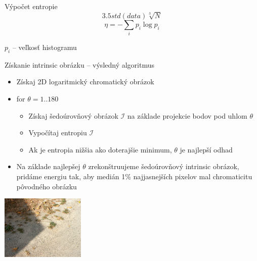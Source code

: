 \documentclass[red]{beamer}
\begin{document}
\begin{frame}{Výpočet entropie}
\pause
{}
\pause
{}
$$ 3.5 std(data)\sqrt[3]{N} $$
\pause
{}
$$ \eta = - \sum_i p_i \log p_i $$
\vspace{-.3cm}
\centerline{$p_i$ -- veľkosť  histogramu}
\end{frame}




\begin{frame}{Získanie intrinsic obrázku -- výsledný algoritmus}
\begin{itemize}[<+->]
\item Získaj 2D logaritmický chromatický obrázok
\item for $\theta=1..180$
\begin{itemize}[<+->]
\item Získaj šedoúrovňový obrázok $\mathcal{I}$ na základe projekcie bodov pod uhlom $\theta$
\item Vypočítaj entropiu $\mathcal{I}$
\item Ak je entropia nižšia ako doterajšie minimum, $\theta$ je najlepší odhad
\end{itemize}
\item Na základe najlepšej $\theta$ zrekonštruujeme šedoúrovňový intrinsic obrázok, pridáme energiu tak, aby medián 1\% najjasnejších pixelov mal chromaticitu pôvodného obrázku
\end{itemize}
\end{frame}



\begin{frame}
\centerline{\includegraphics[width=.75\linewidth]{./img/example}}
\end{frame}
\end{document}
